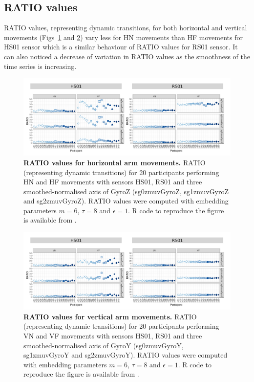 \subsection{RATIO values}
RATIO values, representing dynamic transitions, for both horizontal and
vertical movements (Figs~\ref{fig:ratio_aH} and \ref{fig:ratio_aV})
vary less for HN movements than HF movements for HS01 sensor 
which is a similar behaviour of RATIO values for RS01 sensor.
It can also noticed a decrease of variation in RATIO values as the 
smoothness of the time series is increasing.
\begin{figure}[!h]
\centering
\includegraphics[width=1.0\textwidth]{ratio_aH}
    \caption{
	{\bf RATIO values for horizontal arm movements.}
	RATIO (representing dynamic transitions) for 
	20 participants performing HN and HF movements
	with sensors HS01, RS01 and three smoothed-normalised axis 
	of GyroZ (sg0zmuvGyroZ, sg1zmuvGyroZ and sg2zmuvGyroZ).
	RATIO values were computed with 
	embedding parameters $m=6$, $\tau=8$ and $\epsilon=1$.
	R code to reproduce the figure is available from \cite{hwum2018}.
        }
    \label{fig:ratio_aH}
\end{figure}
\begin{figure}[!h]
\centering
\includegraphics[width=1.0\textwidth]{ratio_aV}
    \caption{
	{\bf RATIO values for vertical arm movements.}
	RATIO (representing dynamic transitions) for 
	20 participants performing VN and VF movements
	with sensors HS01, RS01 and three smoothed-normalised axis 
	of GyroY (sg0zmuvGyroY, sg1zmuvGyroY and sg2zmuvGyroY).
	RATIO values were computed with
	embedding parameters $m=6$, $\tau=8$ and $\epsilon=1$.
	R code to reproduce the figure is available from \cite{hwum2018}.
        }
    \label{fig:ratio_aV}
\end{figure}



